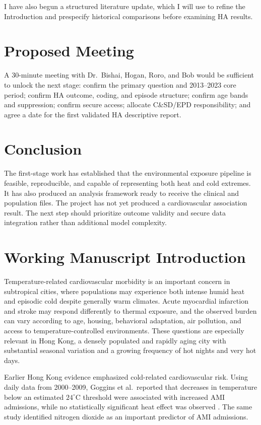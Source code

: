 \documentclass[11pt]{article}
\begin{document}
I have also begun a structured literature update, which I will use to refine
the Introduction and prespecify historical comparisons before examining HA
results.

\section{Proposed Meeting}

A 30-minute meeting with Dr.\ Bishai, Hogan, Roro, and Bob would be sufficient
to unlock the next stage: confirm the primary question and 2013--2023 core
period; confirm HA outcome, coding, and episode structure; confirm age bands
and suppression; confirm secure access; allocate C\&SD/EPD responsibility; and
agree a date for the first validated HA descriptive report.

\section*{Conclusion}

The first-stage work has established that the environmental exposure pipeline
is feasible, reproducible, and capable of representing both heat and cold
extremes. It has also produced an analysis framework ready to receive the
clinical and population files. The project has not yet produced a
cardiovascular association result. The next step should prioritize outcome
validity and secure data integration rather than additional model complexity.

\clearpage
\appendix
\section{Working Manuscript Introduction}

Temperature-related cardiovascular morbidity is an important concern in
subtropical cities, where populations may experience both intense humid heat
and episodic cold despite generally warm climates. Acute myocardial infarction
and stroke may respond differently to thermal exposure, and the observed
burden can vary according to age, housing, behavioral adaptation, air
pollution, and access to temperature-controlled environments. These questions
are especially relevant in Hong Kong, a densely populated and rapidly aging
city with substantial seasonal variation and a growing frequency of hot
nights and very hot days.

Earlier Hong Kong evidence emphasized cold-related cardiovascular risk.
Using daily data from 2000--2009, Goggins et al.\ reported that decreases in
temperature below an estimated $24^\circ$C threshold were associated with
increased AMI admissions, while no statistically significant heat effect was
observed \cite{goggins2013}. The same study identified nitrogen dioxide as an
important predictor of AMI admissions.
\end{document}
